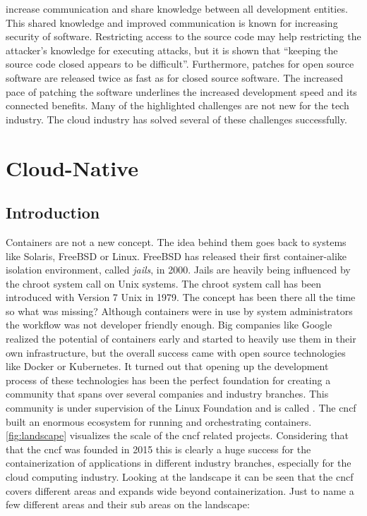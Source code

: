 \documentclass[titlepage]{report}
\begin{document}
increase communication and share knowledge between all development entities. This shared knowledge and improved communication is known for increasing
security of software\cite{hoepman2007increased}. Restricting access to the source code may help restricting the attacker's knowledge for executing attacks, but it is shown that
``keeping the source code closed appears to be difficult''\cite{mercuri2003security}. Furthermore, patches for open source software are released twice as fast
as for closed source software\cite{witten2001does}. The increased pace of patching the software underlines the increased development speed and its connected
benefits. Many of the highlighted challenges are not new for the tech industry. The cloud industry has solved several of these challenges successfully.

\chapter{Cloud-Native}\label{chapter:cloud_native}
\section{Introduction}
Containers are not a new concept. The idea behind them goes back to systems like Solaris, FreeBSD or Linux. FreeBSD has released their first container-alike
isolation environment, called \emph{jails}, in 2000\cite{FreeBSD4Announcement}. Jails are heavily being influenced by the chroot system call on Unix systems.
The chroot system call has been introduced with Version 7 Unix in 1979\cite{BYTE}. The concept has been there all the time so what was missing?
Although containers were in use by system administrators the workflow was not developer friendly enough. Big companies like Google
realized the potential of containers early and started to heavily use them in their own infrastructure, but the overall success
came with open source technologies like Docker or Kubernetes. It turned out that opening up the development process of these technologies
has been the perfect foundation for creating a community that spans over several companies and industry branches. This community is under
supervision of the Linux Foundation and is called \cite{CNCFFounding}. The \gls{cncf} built an enormous ecosystem for
running and orchestrating containers. \autoref{fig:landscape} visualizes the scale of the \gls{cncf} related projects\cite{CNCFLandscape}. Considering that
that the \gls{cncf} was founded in 2015 this is clearly a huge success for the containerization of applications in different industry branches, especially
for the cloud computing industry. Looking at the landscape it can be seen that the \gls{cncf} covers different areas and expands wide beyond containerization.
Just to name a few different areas and their sub areas on the landscape:
\end{document}
